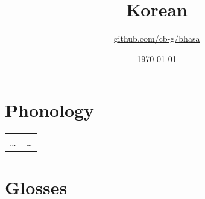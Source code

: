 \documentclass{article}
\title{Korean\\\ipa{[han.gu.g2]}}
\author{\href{https://github.com/cb-g/bhasa}{github.com/cb-g/bhasa}}
\date{\today}
\begin{document}
\pagecolor{custom_bg}\color{custom_fg}
\maketitle\thispagestyle{empty}

\newpage\setcounter{page}{1}\section{Phonology}

\begin{table}[H]
  \color{custom_fg}
  \begin{tabular}{ll}
    \dots & \dots \\
  \end{tabular}
\end{table}

\newpage\section{Glosses}
\end{document}
